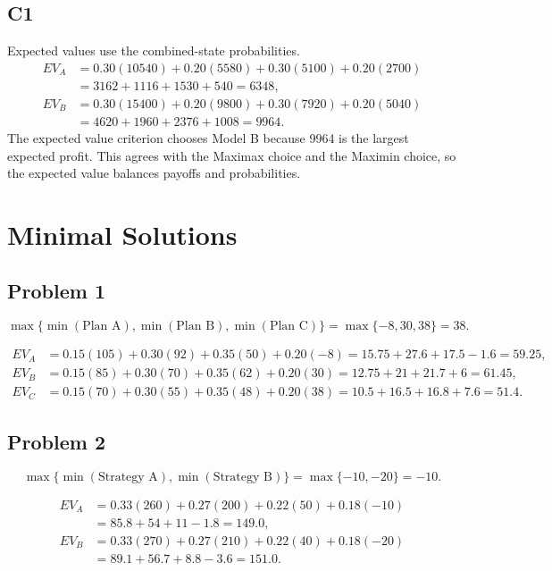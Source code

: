 		\subsection*{C1}
		Expected values use the combined-state probabilities.
		\[
		\begin{aligned}
		EV_A &= 0.30(10540)+0.20(5580)+0.30(5100)+0.20(2700)\\
		&= 3162+1116+1530+540=6348,\\
		EV_B &= 0.30(15400)+0.20(9800)+0.30(7920)+0.20(5040)\\
		&= 4620+1960+2376+1008=9964.
		\end{aligned}
		\]
		The expected value criterion chooses Model B because 9964 is the largest expected profit. This agrees with the Maximax choice and the Maximin choice, so the expected value balances payoffs and probabilities.



\section{Minimal Solutions}

\subsection*{Problem 1}
\[\max\{\min(\text{Plan A}), \min(\text{Plan B}), \min(\text{Plan C})\}
		= \max\{-8, 30, 38\}
		= 38.\]

\[\begin{aligned}
		EV_A &= 0.15(105)+0.30(92)+0.35(50)+0.20(-8)=15.75+27.6+17.5-1.6=59.25,\\
		EV_B &= 0.15(85)+0.30(70)+0.35(62)+0.20(30)=12.75+21+21.7+6=61.45,\\
		EV_C &= 0.15(70)+0.30(55)+0.35(48)+0.20(38)=10.5+16.5+16.8+7.6=51.4.
		\end{aligned}\]

\subsection*{Problem 2}
\[\max\{\min(\text{Strategy A}), \min(\text{Strategy B})\}
		= \max\{-10, -20\}
		= -10.\]

\[\begin{aligned}
		EV_A &= 0.33(260)+0.27(200)+0.22(50)+0.18(-10)\\
		&= 85.8+54+11-1.8=149.0,\\
		EV_B &= 0.33(270)+0.27(210)+0.22(40)+0.18(-20)\\
		&= 89.1+56.7+8.8-3.6=151.0.
		\end{aligned}\]

